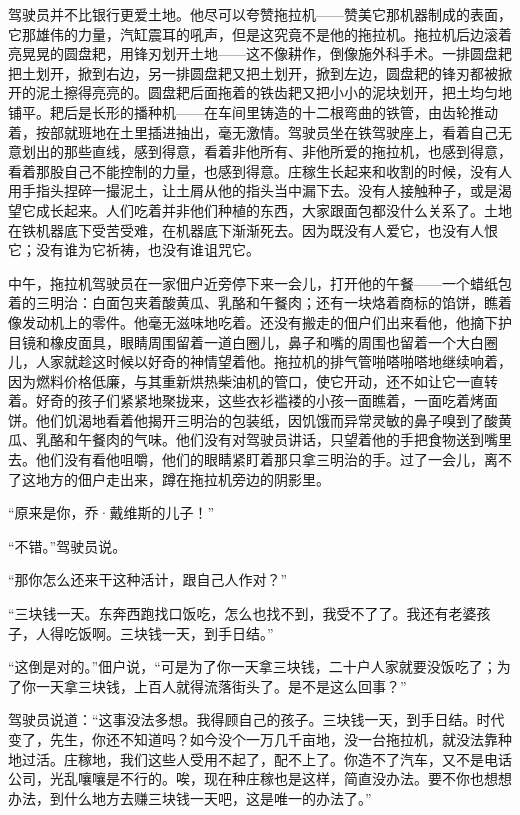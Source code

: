 \documentclass[12pt,UTF-8,openany]{ctexbook}
\begin{document}
\begin{large}
    驾驶员并不比银行更爱土地。他尽可以夸赞拖拉机——赞美它那机器制成的表面，它那雄伟的力量，汽缸震耳的吼声，但是这究竟不是他的拖拉机。拖拉机后边滚着亮晃晃的圆盘耙，用锋刃划开土地——这不像耕作，倒像施外科手术。一排圆盘耙把土划开，掀到右边，另一排圆盘耙又把土划开，掀到左边，圆盘耙的锋刃都被掀开的泥土擦得亮亮的。圆盘耙后面拖着的铁齿耙又把小小的泥块划开，把土均匀地铺平。耙后是长形的播种机——在车间里铸造的十二根弯曲的铁管，由齿轮推动着，按部就班地在土里插进抽出，毫无激情。驾驶员坐在铁驾驶座上，看着自己无意划出的那些直线，感到得意，看着非他所有、非他所爱的拖拉机，也感到得意，看着那股自己不能控制的力量，也感到得意。庄稼生长起来和收割的时候，没有人用手指头捏碎一撮泥土，让土屑从他的指头当中漏下去。没有人接触种子，或是渴望它成长起来。人们吃着并非他们种植的东西，大家跟面包都没什么关系了。土地在铁机器底下受苦受难，在机器底下渐渐死去。因为既没有人爱它，也没有人恨它；没有谁为它祈祷，也没有谁诅咒它。
    
    中午，拖拉机驾驶员在一家佃户近旁停下来一会儿，打开他的午餐——一个蜡纸包着的三明治：白面包夹着酸黄瓜、乳酪和午餐肉；还有一块烙着商标的馅饼，瞧着像发动机上的零件。他毫无滋味地吃着。还没有搬走的佃户们出来看他，他摘下护目镜和橡皮面具，眼睛周围留着一道白圈儿，鼻子和嘴的周围也留着一个大白圈儿，人家就趁这时候以好奇的神情望着他。拖拉机的排气管啪嗒啪嗒地继续响着，因为燃料价格低廉，与其重新烘热柴油机的管口，使它开动，还不如让它一直转着。好奇的孩子们紧紧地聚拢来，这些衣衫褴褛的小孩一面瞧着，一面吃着烤面饼。他们饥渴地看着他揭开三明治的包装纸，因饥饿而异常灵敏的鼻子嗅到了酸黄瓜、乳酪和午餐肉的气味。他们没有对驾驶员讲话，只望着他的手把食物送到嘴里去。他们没有看他咀嚼，他们的眼睛紧盯着那只拿三明治的手。过了一会儿，离不了这地方的佃户走出来，蹲在拖拉机旁边的阴影里。
    
    “原来是你，乔·戴维斯的儿子！”
    
    “不错。”驾驶员说。
    
    “那你怎么还来干这种活计，跟自己人作对？”
    
    “三块钱一天。东奔西跑找口饭吃，怎么也找不到，我受不了了。我还有老婆孩子，人得吃饭啊。三块钱一天，到手日结。”
    
    “这倒是对的。”佃户说，“可是为了你一天拿三块钱，二十户人家就要没饭吃了；为了你一天拿三块钱，上百人就得流落街头了。是不是这么回事？”
    
    驾驶员说道：“这事没法多想。我得顾自己的孩子。三块钱一天，到手日结。时代变了，先生，你还不知道吗？如今没个一万几千亩地，没一台拖拉机，就没法靠种地过活。庄稼地，我们这些人受用不起了，配不上了。你造不了汽车，又不是电话公司，光乱嚷嚷是不行的。唉，现在种庄稼也是这样，简直没办法。要不你也想想办法，到什么地方去赚三块钱一天吧，这是唯一的办法了。”
    

\end{large}
\end{document}
